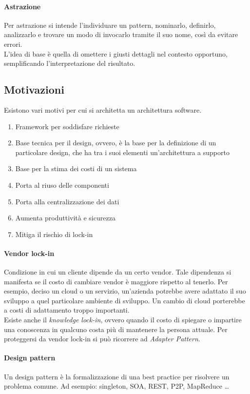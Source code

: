 \paragraph{Astrazione}
Per astrazione si intende l'individuare un pattern, nominarlo, definirlo, 
analizzarlo e trovare un modo di invocarlo tramite il suo nome, così da evitare
errori.\\
L'idea di base è quella di omettere i giusti dettagli nel contesto opportuno, 
semplificando l'interpretazione del risultato.

\subsection{Motivazioni}

Esistono vari motivi per cui si architetta un architettura software.
\begin{enumerate}
    \item Framework per soddisfare richieste
    \item Base tecnica per il design, ovvero, è la base per la definizione di un
     particolare design, che ha tra i suoi elementi un'architettura a supporto
    \item Base per la stima dei costi di un sistema
    \item Porta al riuso delle componenti
    \item Porta alla centralizzazione dei dati
    \item Aumenta produttività e sicurezza
    \item Mitiga il rischio di lock-in
\end{enumerate}

\paragraph{Vendor lock-in}
Condizione in cui un cliente dipende da un certo vendor.
Tale dipendenza si manifesta se il costo di cambiare vendor è maggiore rispetto al 
tenerlo. Per esempio, deciso un cloud o un servizio, un'azienda potrebbe avere 
adattato il suo sviluppo a quel particolare ambiente di sviluppo. Un cambio di 
cloud porterebbe a costi di adattamento troppo importanti.\\
Esiste anche il \emph{knowledge lock-in}, ovvero quando il costo di spiegare o impartire 
una conoscenza in qualcuno costa più di mantenere la persona attuale.
Per proteggersi da vendor lock-in si può ricorrere ad \emph{Adapter Pattern}.

\paragraph{Design pattern}
Un design pattern è la formalizzazione di una best practice per risolvere un
problema comune.
Ad esempio: singleton, SOA, REST, P2P, MapReduce \dots


